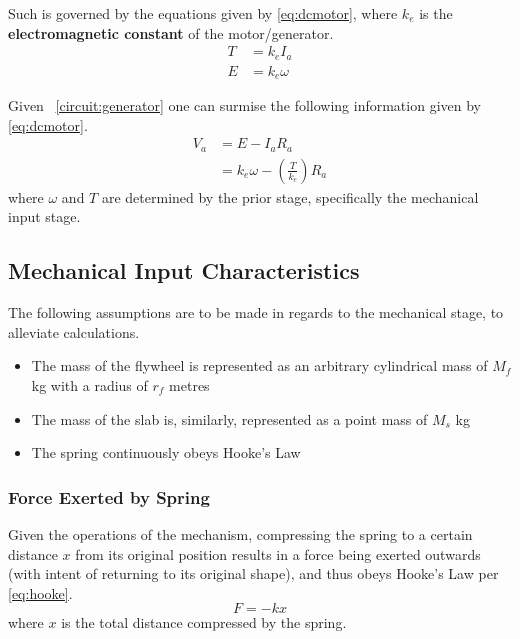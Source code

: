 \documentclass[conference]{IEEEtran}
\newcommand{\figref}[1]{\figurename~\ref{#1}}
\begin{document}
Such is governed by the equations given by \eqref{eq:dcmotor}, where $k_e$ is the \textbf{electromagnetic constant} of the motor/generator.
\begin{subequations}
    \label{eq:dcmotor}
    \begin{align}
        T &= k_e I_a
        \label{eq:dcmotor:torque}\\
        E &= k_e \omega
        \label{eq:dcmotor:emf}
    \end{align}
\end{subequations}

Given \figref{circuit:generator} one can surmise the following information given by \eqref{eq:dcmotor}.
\begin{equation}
    \label{eq:circuit}
    \begin{aligned}
        V_a &= E - I_aR_a\\
        &= k_e\omega - \left(\frac{T}{k_e}\right)R_a
    \end{aligned}
\end{equation}
where \(\omega\) and \(T\) are determined by the prior stage, specifically the mechanical input stage.

\subsection{Mechanical Input Characteristics}
The following assumptions are to be made in regards to the mechanical stage, to alleviate calculations.
\begin{itemize}
    \item The mass of the flywheel is represented as an arbitrary cylindrical mass of \(M_f\) kg with a radius of \(r_f\) metres
    \item The mass of the slab is, similarly, represented as a point mass of \(M_s\) kg
    \item The spring continuously obeys Hooke's Law
\end{itemize}

\subsubsection{Force Exerted by Spring}
Given the operations of the mechanism, compressing the spring to a certain distance \(x\) from its original position results in a force being exerted outwards (with intent of returning to its original shape), and thus obeys Hooke's Law per \eqref{eq:hooke}.
\begin{equation}
    \label{eq:hooke}
    F = -kx
\end{equation}
where \(x\) is the total distance compressed by the spring.
\end{document}
